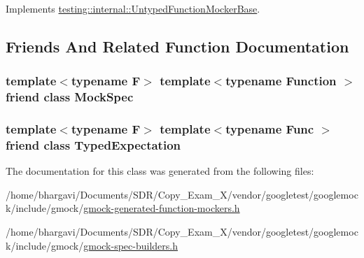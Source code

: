 Implements \hyperlink{classtesting_1_1internal_1_1_untyped_function_mocker_base_a2cb149456cd559d5b0615f2310b235e3}{testing\+::internal\+::\+Untyped\+Function\+Mocker\+Base}.



\subsection{Friends And Related Function Documentation}
\subsubsection[{\texorpdfstring{Mock\+Spec}{MockSpec}}]{\setlength{\rightskip}{0pt plus 5cm}template$<$typename F$>$ template$<$typename Function $>$ friend class {\bf Mock\+Spec}\hspace{0.3cm}{\ttfamily [friend]}}\hypertarget{classtesting_1_1internal_1_1_function_mocker_base_ae72aeee91c93e8ae5e1ed7f726a766b2}{}\label{classtesting_1_1internal_1_1_function_mocker_base_ae72aeee91c93e8ae5e1ed7f726a766b2}
\subsubsection[{\texorpdfstring{Typed\+Expectation}{TypedExpectation}}]{\setlength{\rightskip}{0pt plus 5cm}template$<$typename F$>$ template$<$typename Func $>$ friend class {\bf Typed\+Expectation}\hspace{0.3cm}{\ttfamily [friend]}}\hypertarget{classtesting_1_1internal_1_1_function_mocker_base_a4f17de55396a8ef740d5ad2b1380a851}{}\label{classtesting_1_1internal_1_1_function_mocker_base_a4f17de55396a8ef740d5ad2b1380a851}


The documentation for this class was generated from the following files\+:\begin{DoxyCompactItemize}
\item 
/home/bhargavi/\+Documents/\+S\+D\+R/\+Copy\+\_\+\+Exam\+\_\+X/vendor/googletest/googlemock/include/gmock/\hyperlink{gmock-generated-function-mockers_8h}{gmock-\/generated-\/function-\/mockers.\+h}\item 
/home/bhargavi/\+Documents/\+S\+D\+R/\+Copy\+\_\+\+Exam\+\_\+X/vendor/googletest/googlemock/include/gmock/\hyperlink{gmock-spec-builders_8h}{gmock-\/spec-\/builders.\+h}\end{DoxyCompactItemize}
